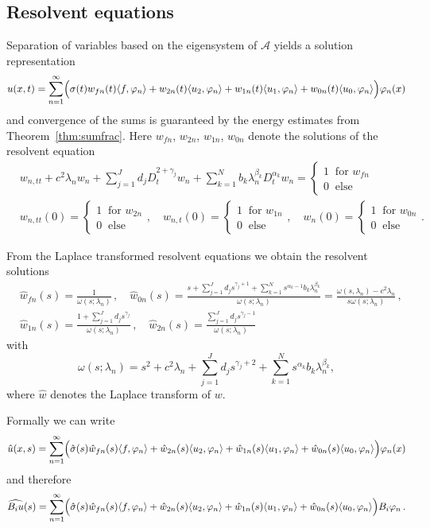 \subsection{Resolvent equations}

Separation of variables based on the eigensystem of $\mathcal{A}$ yields a solution representation
\[
u(x,t)=\sum_{n=1}^\infty \Bigl(
\sigma(t)w_{fn}(t)\langle f,\varphi_n\rangle 
+w_{2n}(t)\langle u_2,\varphi_n\rangle 
+w_{1n}(t)\langle u_1,\varphi_n\rangle 
+w_{0n}(t)\langle u_0,\varphi_n\rangle
\Bigr)\varphi_n(x)
\]
and convergence of the sums is guaranteed by the energy estimates from Theorem~\ref{thm:sumfrac}.
Here $w_{fn}$, $w_{2n}$, $w_{1n}$, $w_{0n}$ denote the solutions of the
resolvent equation
\[
\begin{aligned}
&w_{n,tt}+c^2\lambda_n w_n
+\sum_{j=1}^J d_j D_t^{2+\gamma_j}w_n
+\sum_{k=1}^N b_k\lambda_n^{\beta_k} D_t^{\alpha_k} w_n = 
\begin{cases}1\ \mbox{ for }w_{fn}\\0\ \mbox{ else}\end{cases}\\
&
w_{n,tt}(0)=\begin{cases}1\ \mbox{ for }w_{2n}\\0\ \mbox{ else}\end{cases}, \quad
w_{n,t}(0)=\begin{cases}1\ \mbox{ for }w_{1n}\\0\ \mbox{ else}\end{cases}, \quad
w_{n}(0)=\begin{cases}1\ \mbox{ for }w_{0n}\\0\ \mbox{ else}\end{cases}.
\end{aligned}
\]

From the Laplace transformed resolvent equations we obtain the resolvent solutions
\[ \begin{aligned}
&\hat{w}_{fn}(s)=\frac{1}{
\omega(s;\lambda_n)}
\,, \quad
\hat{w}_{0n}(s)=
\frac{s+\sum_{j=1}^J d_j s^{\gamma_j+1}+\sum_{k=1}^N s^{\alpha_k-1} b_{k}\lambda_n^{\beta_{k}}}{
\omega(s;\lambda_n)}
=\frac{\omega(s,\lambda_n)-c^2\lambda_n}{s\omega(s;\lambda_n)}
\,, \\
&\hat{w}_{1n}(s)=\frac{1+\sum_{j=1}^J d_j s^{\gamma_j}}{
\omega(s;\lambda_n)}
\,, \quad
\hat{w}_{2n}(s)=\frac{\sum_{j=1}^J d_j s^{\gamma_j-1}}{
\omega(s;\lambda_n)}
\end{aligned}\]
with 
\[
\omega(s;\lambda_n)=s^2+c^2\lambda_n+\sum_{j=1}^J d_j s^{\gamma_j+2}+\sum_{k=1}^N s^{\alpha_k} b_{k}\lambda_n^{\beta_{k}},
\]
where $\hat{w}$ denotes the Laplace transform of $w$.

Formally we can write
\[
\hat{u}(x,s)=\sum_{n=1}^\infty \Bigl(
\hat{\sigma}(s)\hat{w}_{fn}(s)\langle f,\varphi_n\rangle 
+\hat{w}_{2n}(s)\langle u_2,\varphi_n\rangle 
+\hat{w}_{1n}(s)\langle u_1,\varphi_n\rangle 
+\hat{w}_{0n}(s)\langle u_0,\varphi_n\rangle
\Bigr)\varphi_n(x)
\]
and therefore
\[
\widehat{B_iu}(s)=\sum_{n=1}^\infty \Bigl(
\hat{\sigma}(s)\hat{w}_{fn}(s)\langle f,\varphi_n\rangle 
+\hat{w}_{2n}(s)\langle u_2,\varphi_n\rangle 
+\hat{w}_{1n}(s)\langle u_1,\varphi_n\rangle 
+\hat{w}_{0n}(s)\langle u_0,\varphi_n\rangle
\Bigr)B_i\varphi_n\,.
\]

